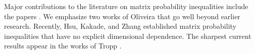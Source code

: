 \documentclass[11pt,letterpaper,twoside,reqno,nosumlimits]{amsart}
\theoremstyle{remark}
\numberwithin{equation}{section}
\numberwithin{thm}{section}
\numberwithin{prop}{section}
\numberwithin{defn}{section}
\numberwithin{remark}{section}
\begin{document}
Major contributions to the literature on matrix probability inequalities include the papers \cite{CM08,Recht09,Gross11}. We emphasize two works of Oliveira \cite{Oliv09,Oliv10} that go well beyond earlier research. Recently, Hsu, Kakade, and Zhang \cite{HsuKakadeZhang11} established matrix probability inequalities that have no explicit dimensional dependence. The sharpest current results appear in the works of Tropp \cite{T10a,T10b,Tropp11}. 



\end{document}
